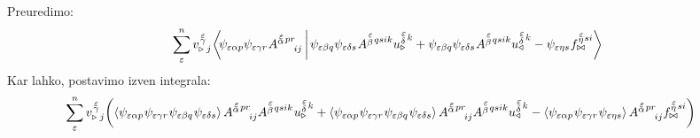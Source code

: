 Preuredimo:
\begin{equation*}
   \sum^n_\varepsilon
   v^{\mkern 2mu \substack{\varepsilon \\[-0.65mm] \gamma \\[-0.2mm]}}_{\triangleright \mkern5mu j} \mkern-2mu
   \braket{
      \mkern-4mu \psi_{ \varepsilon \alpha p}
      \psi_{\varepsilon \gamma r} \mkern1mu
      A^{\substack{\mkern2mu \varepsilon \\[-0.65mm] \alpha} \mkern2mu p r}_{\mkern29mu i j}  \mkern3mu }
   {
      \mkern2mu \psi_{\varepsilon \beta q}
      \psi_{\varepsilon \delta s} \mkern1mu
      A^{\substack{\mkern2mu \varepsilon \\[0.05mm] \beta} \mkern2mu q s i k}
      u^{\substack{\mkern2mu \varepsilon \\[0.09mm] \delta} \mkern2mu k}_\triangleright
      +
      \psi_{\varepsilon \beta q}
      \psi_{\varepsilon \delta s} \mkern1mu
      A^{\substack{\mkern2mu \varepsilon \\[0.05mm] \beta} \mkern2mu q s i k}
      u^{\substack{\mkern2mu \varepsilon \\[0.09mm] \delta} \mkern2mu k}_\triangleleft
      -
      \psi_{\varepsilon \eta s} \mkern1mu
      f^{\substack{\mkern2mu \varepsilon \\[-0.59mm] \eta} \mkern1mu s i}_{\bowtie} }
\end{equation*}
Kar lahko, postavimo izven integrala:
\begin{equation*}
   \mkern-20mu \sum^n_\varepsilon
   v^{\mkern 2mu \substack{\varepsilon \\[-0.65mm] \gamma \\[-0.2mm]}}_{\triangleright \mkern5mu j}
   \qty( \expval{
      \psi_{ \varepsilon \alpha p} \mkern1mu
      \psi_{\varepsilon \gamma r} \mkern1mu
      \psi_{\varepsilon \beta q} \mkern1mu
      \psi_{\varepsilon \delta s} }
   A^{\substack{\mkern2mu \varepsilon \\[-0.65mm] \alpha} \mkern2mu p r}_{\mkern29mu i j}
   A^{\substack{\mkern2mu \varepsilon \\[0.05mm] \beta} \mkern2mu q s i k} \mkern1mu
   u^{\substack{\mkern2mu \varepsilon \\[0.09mm] \delta} \mkern2mu k}_\triangleright
   +
   \expval{
      \psi_{ \varepsilon \alpha p} \mkern1mu
      \psi_{\varepsilon \gamma r} \mkern1mu
      \psi_{\varepsilon \beta q} \mkern1mu
      \psi_{\varepsilon \delta s} }
   A^{\substack{\mkern2mu \varepsilon \\[-0.65mm] \alpha} \mkern2mu p r}_{\mkern29mu i j}
   A^{\substack{\mkern2mu \varepsilon \\[0.05mm] \beta} \mkern2mu q s i k}
   u^{\substack{\mkern2mu \varepsilon \\[0.09mm] \delta} \mkern2mu k}_\triangleleft
   -
   \expval{
      \psi_{ \varepsilon \alpha p} \mkern1mu
      \psi_{\varepsilon \gamma r} \mkern1mu
      \psi_{\varepsilon \eta s} }
   A^{\substack{\mkern2mu \varepsilon \\[-0.65mm] \alpha} \mkern2mu p r}_{\mkern29mu i j}
   f^{\substack{\mkern2mu \varepsilon \\[-0.59mm] \eta} \mkern2mu s i}_{\bowtie} )
\end{equation*}
